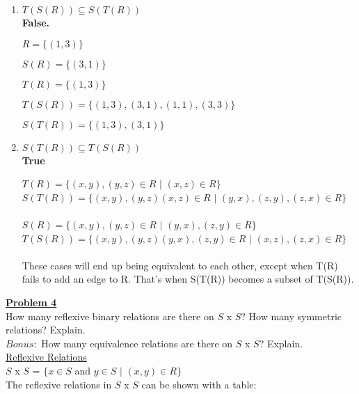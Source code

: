 \documentclass[11pt]{article}
\begin{document}
	\begin{enumerate}
		\item $T(S(R)) \subseteq S(T(R))$ \\
			\textbf{False.}

			$R = \{(1 , 3)\}$ 

			$S(R) = \{(3, 1)\}$ 

			$T(R) = \{(1,3)\}$

			$T(S(R)) = \{(1, 3) , (3, 1) , (1, 1) , (3, 3)\}$

			$S(T(R)) = \{(1, 3) , (3, 1)\}$

		\item $S(T(R)) \subseteq T(S(R))$ \\
			\textbf{True}

			$T(R) = \{ (x, y) , (y, z) \in R$ $|$ $(x, z) \in R \}$ \\
			$S(T(R)) = \{ (x, y) , (y, z) (x, z) \in R$ $|$ $(y, x), (z, y), (z, x) \in R\}$ \\
			\\
			$S(R) = \{ (x, y) , (y, z) \in R$ $|$ $(y, x), (z, y) \in R \}$ \\
			$T(S(R)) = \{ (x, y) , (y, z) (y, x), (z, y) \in R$ $|$ $(x, z), (z, x) \in R\}$ \\\\

			These cases will end up being equivalent to each other, except when T(R) fails to add an edge to R. That's when S(T(R)) becomes a subset of T(S(R)).
	\end{enumerate}

	\noindent\textbf{\underline{Problem 4}}\\
	How many reflexive binary relations are there on $S$ x $S$? How many symmetric relations? Explain. \\
	$Bonus:$ How many equivalence relations are there on $S$ x $S$? Explain. \\

	\underline{Reflexive Relations} \\

	$S$ x $S$ = $\{ x \in S$ and $y \in S$ $|$ $(x, y) \in R\}$\\

	The reflexive relations in $S$ x $S$ can be shown with a table: \\\\
\end{document}
